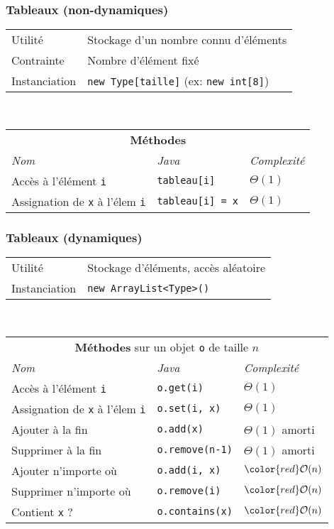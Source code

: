 \documentclass[8pt,aspectratio=169]{beamer}
\begin{document}
\begin{frame}
\frametitle{Tableaux (non-dynamiques)}
\centering
\begin{tabular}{lll}
	Utilité & \multicolumn{2}{l}{Stockage d'un nombre connu d'éléments}\\
	Contrainte & \multicolumn{2}{l}{Nombre d'élément fixé}\\
	Instanciation & \multicolumn{2}{l}{\texttt{new Type[taille]} (ex: \texttt{new int[8]})}\\
\end{tabular}\\
\vspace{0.5cm}
\centering
\begin{tabular}{lll}
	\multicolumn{3}{c}{\textbf{Méthodes}} \\
	\textit{Nom} & \textit{Java} & \textit{Complexité} \\
	Accès à l'élément \texttt{i} & \texttt{tableau[i]} & $\Theta(1)$\\
	Assignation de \texttt{x} à l'élem \texttt{i} & \texttt{tableau[i] = x} & $\Theta(1)$\\
\end{tabular}
\end{frame}

\begin{frame}
\frametitle{Tableaux (dynamiques)}
\centering
\begin{tabular}{ll}
	Utilité & Stockage d'éléments, accès aléatoire\\
	Instanciation & \texttt{new ArrayList<Type>()}\\
\end{tabular}\\
\vspace{0.5cm}
\centering
\begin{tabular}{lll}
	\multicolumn{3}{c}{\textbf{Méthodes} sur un objet \texttt{o} de taille $n$} \\
	\textit{Nom} & \textit{Java} & \textit{Complexité} \\
	Accès à l'élément \texttt{i} & \texttt{o.get(i)} & $\Theta(1)$\\
	Assignation de \texttt{x} à l'élem \texttt{i} & \texttt{o.set(i, x)} & $\Theta(1)$\\
	Ajouter à la fin & \texttt{o.add(x)} & $\Theta(1)$ \color{orange}amorti\\
	Supprimer à la fin & \texttt{o.remove(n-1)} & $\Theta(1)$ \color{orange}amorti\\
	Ajouter n'importe où & \texttt{o.add(i, x)} & $\color{red}\mathcal{O}(n)$\\
	Supprimer n'importe où & \texttt{o.remove(i)} & $\color{red}\mathcal{O}(n)$\\
	Contient \texttt{x} ? & \texttt{o.contains(x)} & $\color{red}\mathcal{O}(n)$\\
\end{tabular}
\end{frame}
\end{document}
